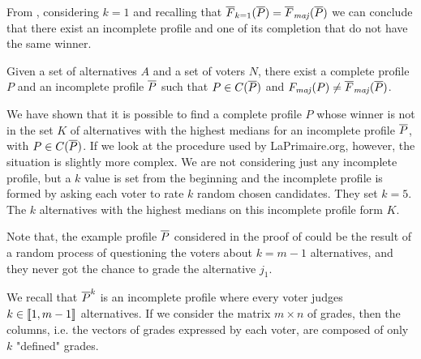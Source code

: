 	From , considering $k=1$ and recalling that $\overline{F}_{k=1}(\Pbar) = \Fmajbar(\Pbar)$ we can conclude that there exist an incomplete profile and one of its completion that do not have the same winner.
	\begin{remark}
		Given a set of alternatives $A$ and a set of voters $N$, there exist a complete profile $P$ and an incomplete profile $\overline{P}$ such that $P \in C(\overline{P})$ and $\Fmaj(P) \neq \Fmajbar(\Pbar)$.
	\end{remark}

	
	We have shown that it is possible to find a complete profile $P$ whose winner is not in the set $K$ of alternatives with the highest medians for an incomplete profile $\overline{P}$, with $P \in C(\overline{P})$.
	If we look at the procedure used by LaPrimaire.org, however, the situation is slightly more complex. We are not considering just any incomplete profile, but a $k$ value is set from the beginning and the incomplete profile is formed by asking each voter to rate $k$ random chosen candidates. They set $k=5$.
	The $k$ alternatives with the highest medians on this incomplete profile form $K$.
	
	Note that, the example profile $\overline{P}$ considered in the proof of  could be the result of a random process of questioning the voters about $k=m-1$ alternatives, and they never got the chance to grade the alternative $j_1$.
	
	We recall that $\overline{P}^k$ is an incomplete profile where every voter judges $k\in \llbracket1,m-1\rrbracket$ alternatives. If we consider the matrix $m \times n$ of grades, then the columns, i.e. the vectors of grades expressed by each voter, are composed of only $k$ "defined" grades.
	
